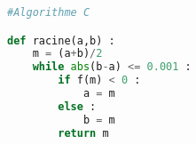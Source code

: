 \begin{lstlisting}[language=python]
#Algorithme C

def racine(a,b) :
	m = (a+b)/2
	while abs(b-a) <= 0.001 :
		if f(m) < 0 :
			a = m
		else :
			b = m
		return m
\end{lstlisting}
